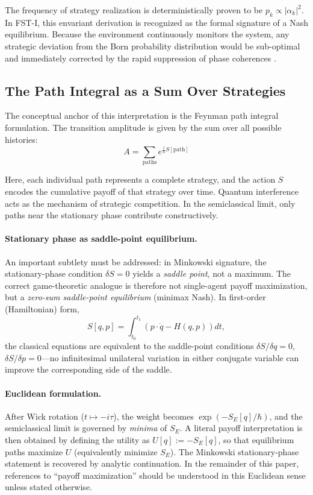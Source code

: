 \documentclass[12pt,a4paper]{article}
\theoremstyle{remark}
\begin{document}
The frequency of strategy realization is deterministically proven to be $p_k \propto |\alpha_k|^2$. In FST-I, this envariant derivation is recognized as the formal signature of a Nash equilibrium. Because the environment continuously monitors the system, any strategic deviation from the Born probability distribution would be sub-optimal and immediately corrected by the rapid suppression of phase coherences \citep{DynamicalOrigin2005}.

\subsection{The Path Integral as a Sum Over Strategies}

The conceptual anchor of this interpretation is the Feynman path integral formulation. The transition amplitude is given by the sum over all possible histories:
\begin{equation}
A = \sum_{\text{paths}} e^{\frac{i}{\hbar} S[\text{path}]}
\end{equation}

Here, each individual path represents a complete strategy, and the action $S$ encodes the cumulative payoff of that strategy over time. Quantum interference acts as the mechanism of strategic competition. In the semiclassical limit, only paths near the stationary phase contribute constructively.

\paragraph{Stationary phase as saddle-point equilibrium.}
An important subtlety must be addressed: in Minkowski signature, the stationary-phase condition $\delta S = 0$ yields a \emph{saddle point}, not a maximum. The correct game-theoretic analogue is therefore not single-agent payoff maximization, but a \emph{zero-sum saddle-point equilibrium} (minimax Nash). In first-order (Hamiltonian) form,
\begin{equation}
S[q,p] = \int_{t_0}^{t_1} \left( p \cdot \dot{q} - H(q,p) \right) dt,
\end{equation}
the classical equations are equivalent to the saddle-point conditions $\delta S / \delta q = 0$, $\delta S / \delta p = 0$---no infinitesimal unilateral variation in either conjugate variable can improve the corresponding side of the saddle.

\paragraph{Euclidean formulation.}
After Wick rotation ($t \mapsto -i\tau$), the weight becomes $\exp(-S_E[q]/\hbar)$, and the semiclassical limit is governed by \emph{minima} of $S_E$. A literal payoff interpretation is then obtained by defining the utility as $U[q] := -S_E[q]$, so that equilibrium paths maximize $U$ (equivalently minimize $S_E$). The Minkowski stationary-phase statement is recovered by analytic continuation. In the remainder of this paper, references to ``payoff maximization'' should be understood in this Euclidean sense unless stated otherwise.
\end{document}
